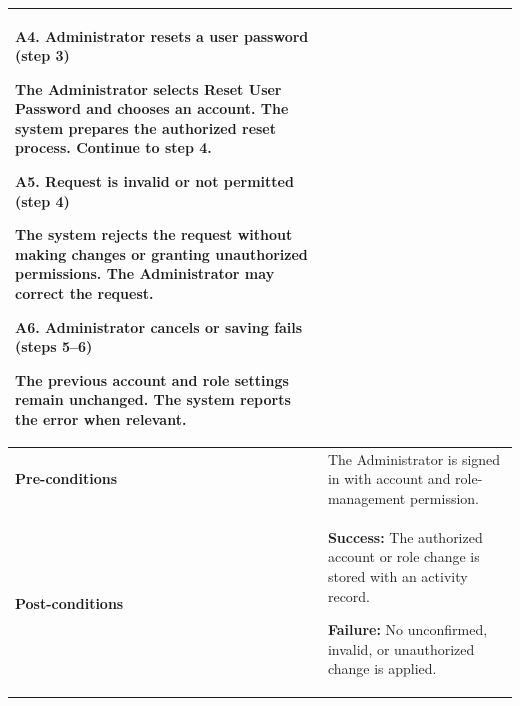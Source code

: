 \begin{longtable}{|p{}|p{}|}
\textbf{A4. Administrator resets a user password (step 3)}\par
The Administrator selects Reset User Password and chooses an account. The system prepares the authorized reset process. Continue to step 4.\par\smallskip
\textbf{A5. Request is invalid or not permitted (step 4)}\par
The system rejects the request without making changes or granting unauthorized permissions. The Administrator may correct the request.\par\smallskip
\textbf{A6. Administrator cancels or saving fails (steps 5--6)}\par
The previous account and role settings remain unchanged. The system reports the error when relevant.
\\ \hline
\textbf{Pre-conditions} &
The Administrator is signed in with account and role-management permission. \\ \hline
\textbf{Post-conditions} &
\textbf{Success:} The authorized account or role change is stored with an activity record.\par
\textbf{Failure:} No unconfirmed, invalid, or unauthorized change is applied.
\\ \hline
\end{longtable}
\clearpage
